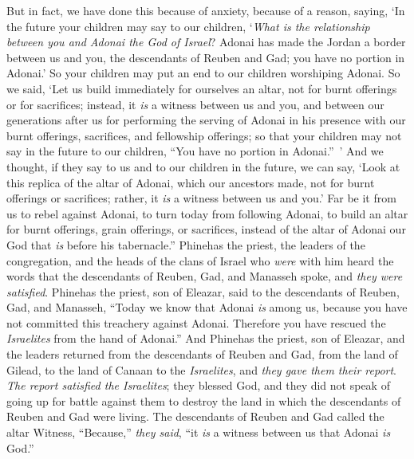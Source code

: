 \begin{biblechapter}
\verse But in fact, we have done this because of anxiety, because of a reason, saying, ‘In the future your children may say to our children, ‘\textit{What is the relationship between you and Adonai the God of Israel}?
\verse Adonai has made the Jordan a border between us and you, the descendants of Reuben and Gad; you have no portion in Adonai.’ So your children may put an end to our children worshiping Adonai.
\verse So we said, ‘Let us build immediately for ourselves an altar, not for burnt offerings or for sacrifices;
\verse instead, it \textit{is} a witness between us and you, and between our generations after us for performing the serving of Adonai in his presence with our burnt offerings, sacrifices, and fellowship offerings; so that your children may not say in the future to our children, “You have no portion in Adonai.” ’
\verse And we thought, if they say to us and to our children in the future, we can say, ‘Look at this replica of the altar of Adonai, which our ancestors made, not for burnt offerings or sacrifices; rather, it \textit{is} a witness between us and you.’
\verse Far be it from us to rebel against Adonai, to turn today from following Adonai, to build an altar for burnt offerings, grain offerings, or sacrifices, instead of the altar of Adonai our God that \textit{is} before his tabernacle.”
\verse Phinehas the priest, the leaders of the congregation, and the heads of the clans of Israel who \textit{were} with him heard the words that the descendants of Reuben, Gad, and Manasseh spoke, and \textit{they were satisfied}.
\verse Phinehas the priest, son of Eleazar, said to the descendants of Reuben, Gad, and Manasseh, “Today we know that Adonai \textit{is} among us, because you have not committed this treachery against Adonai. Therefore you have rescued the \textit{Israelites} from the hand of Adonai.”
\verse And Phinehas the priest, son of Eleazar, and the leaders returned from the descendants of Reuben and Gad, from the land of Gilead, to the land of Canaan to the \textit{Israelites}, and \textit{they gave them their report}.
\verse \textit{The report satisfied the Israelites}; they blessed God, and they did not speak of going up for battle against them to destroy the land in which the descendants of Reuben and Gad were living.
\verse The descendants of Reuben and Gad called the altar Witness, “Because,” \textit{they said}, “it \textit{is} a witness between us that Adonai \textit{is} God.”
\end{biblechapter}

